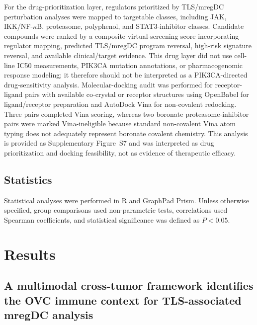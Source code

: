 \documentclass[cancers,article,submit,pdftex,moreauthors]{Definitions/mdpi}
\begin{document}
For the drug-prioritization layer, regulators prioritized by TLS/mregDC perturbation analyses were mapped to targetable classes, including JAK, IKK/NF-$\kappa$B, proteasome, polyphenol, and STAT3-inhibitor classes. Candidate compounds were ranked by a composite virtual-screening score incorporating regulator mapping, predicted TLS/mregDC program reversal, high-risk signature reversal, and available clinical/target evidence. This drug layer did not use cell-line IC50 measurements, PIK3CA mutation annotations, or pharmacogenomic response modeling; it therefore should not be interpreted as a PIK3CA-directed drug-sensitivity analysis. Molecular-docking audit was performed for receptor-ligand pairs with available co-crystal or receptor structures using OpenBabel for ligand/receptor preparation and AutoDock Vina for non-covalent redocking. Three pairs completed Vina scoring, whereas two boronate proteasome-inhibitor pairs were marked Vina-ineligible because standard non-covalent Vina atom typing does not adequately represent boronate covalent chemistry. This analysis is provided as Supplementary Figure~S7 and was interpreted as drug prioritization and docking feasibility, not as evidence of therapeutic efficacy.

\subsection{Statistics}
Statistical analyses were performed in R and GraphPad Prism. Unless otherwise specified, group comparisons used non-parametric tests, correlations used Spearman coefficients, and statistical significance was defined as $P<0.05$\cite{bib65,bib66,bib67}.

\section{Results}
\subsection{A multimodal cross-tumor framework identifies the OVC immune context for TLS-associated mregDC analysis}
\end{document}
